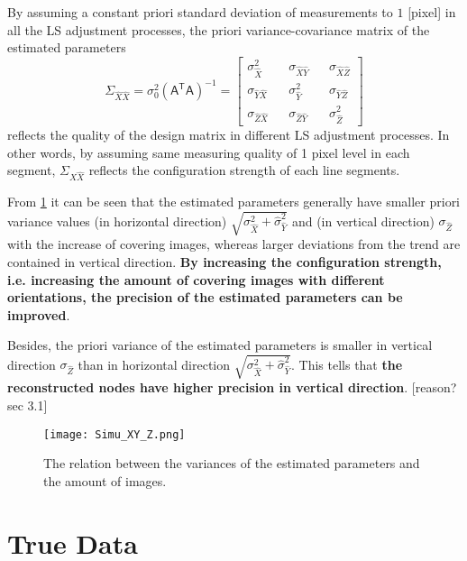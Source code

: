 By assuming a constant priori standard deviation of measurements to $1$ [pixel] in all the LS adjustment processes, the priori variance-covariance matrix of the estimated parameters
\begin{equation}
\Sigma_{\hat{X}\hat{X}}=\sigma_0^2(\mathsf{A^TA})^{-1}=
\begin{bmatrix}
\sigma_{\hat{X}}^2 && \sigma_{\hat{X}\hat{Y}} && \sigma_{\hat{X}\hat{Z}} \\
\sigma_{\hat{Y}\hat{X}} && \sigma_{\hat{Y}}^2 && \sigma_{\hat{Y}\hat{Z}} \\
\sigma_{\hat{Z}\hat{X}} && \sigma_{\hat{Z}\hat{Y}} && \sigma_{\hat{Z}}^2
\end{bmatrix}
\end{equation}
reflects the quality of the design matrix in different LS adjustment processes. In other words, by assuming same measuring quality of 1 pixel level in each segment, $\Sigma_{\hat{X}\hat{X}}$ reflects the configuration strength of each line segments.


From \cref{fig:SimuSigmaxx} it can be seen that the estimated parameters generally have smaller priori variance values (in horizontal direction) $\sqrt{\sigma_{\hat{X}}^2+\hat{\sigma}_{\hat{Y}}^2}$ and (in vertical direction) $\sigma_{\hat{Z}}$ with the increase of covering images, whereas larger deviations from the trend are contained in vertical direction. \textbf{By increasing the configuration strength, i.e. increasing the amount of covering images with different orientations, the precision of the estimated parameters can be improved}.

Besides, the priori variance of the estimated parameters is smaller in vertical direction $\sigma_{\hat{Z}}$ than in horizontal direction $\sqrt{\sigma_{\hat{X}}^2+\hat{\sigma}_{\hat{Y}}^2}$. This tells that \textbf{the reconstructed nodes have higher precision in vertical direction}. [reason? sec 3.1]


\begin{figure}
  \centering
  \texttt{[image: Simu\_XY\_Z.png]}
  \caption{\small The relation between the variances of the estimated parameters and the amount of images.}
  \label{fig:SimuSigmaxx}
\end{figure}

\clearpage
\section{True Data}
\label{sec:truedata}


